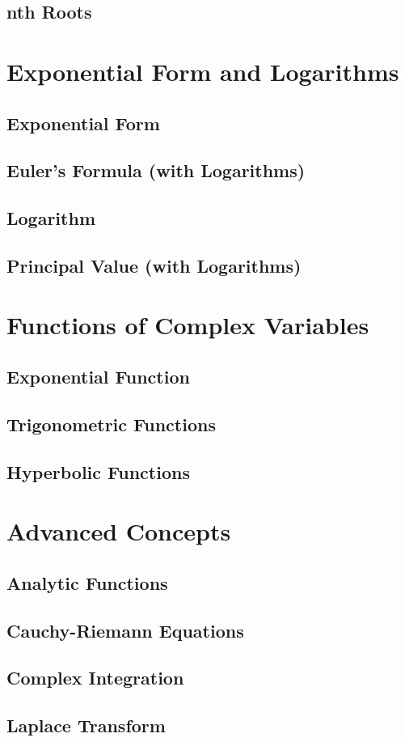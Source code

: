 \documentclass[12pt]{article}
\begin{document}
    \subsection{nth Roots}
    
    \section{Exponential Form and Logarithms}
    \subsection{Exponential Form}
    \subsection{Euler's Formula (with Logarithms)}
    \subsection{Logarithm}
    \subsection{Principal Value (with Logarithms)}

    \section{Functions of Complex Variables}
    \subsection{Exponential Function}
    \subsection{Trigonometric Functions}
    \subsection{Hyperbolic Functions}

    \section{Advanced Concepts}
    \subsection{Analytic Functions}
    \subsection{Cauchy-Riemann Equations}
    \subsection{Complex Integration}
    \subsection{Laplace Transform}
\end{document}
